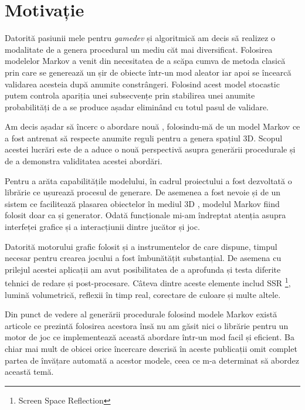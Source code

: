 \chapter*{Motivație} 

Datorită pasiunii mele pentru \textit{gamedev} și algoritmică am decis să realizez o modalitate de a genera procedural un mediu căt mai diversificat. Folosirea modelelor Markov a venit din necesitatea de a scăpa cumva de metoda clasică prin care se generează un șir de obiecte într-un mod aleator iar apoi se încearcă validarea acesteia după anumite constrângeri. Folosind acest model stocastic putem controla apariția unei subsecvențe prin stabilirea unei anumite probabilități de a se produce așadar eliminând cu totul pasul de validare.\par

Am decis așadar să încerc o abordare nouă , folosindu-mă de un model Markov ce a fost antrenat să respecte anumite reguli pentru a genera spațiul 3D. Scopul acestei lucrări este de a aduce o nouă perspectivă asupra generării procedurale și de a demonstra validitatea acestei abordări.\par

Pentru a arăta capabilitățile modelului, în cadrul proiectului a fost dezvoltată o librărie ce ușurează procesul de generare. De asemenea a fost nevoie și de un sistem ce facilitează plasarea obiectelor în mediul 3D , modelul Markov fiind folosit doar ca și generator. Odată funcționale mi-am îndreptat atenția asupra interfeței grafice și a interacțiunii dintre jucător și joc.\par

Datorită motorului grafic folosit și a instrumentelor de care dispune, timpul necesar pentru crearea jocului a fost îmbunătățit substanțial. De asemena cu prilejul acestei aplicații am avut posibilitatea de a aprofunda și testa diferite tehnici de redare și post-procesare. Câteva dintre aceste elemente includ SSR \footnote{Screen Space Reflection}, lumină volumetrică, reflexii în timp real, corectare de culoare și multe altele.\par

Din punct de vedere al generării procedurale folosind modele Markov există articole ce prezintă folosirea acestora însă nu am găsit nici o librărie pentru un motor de joc ce implementează această abordare într-un mod facil și eficient. Ba chiar mai mult de obicei orice încercare descrisă în aceste publicații omit complet partea de învățare automată a acestor modele, ceea ce m-a determinat să abordez această temă.\par

